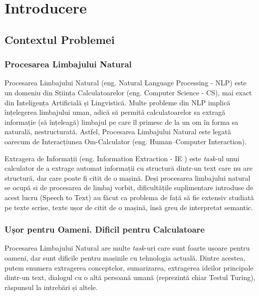 \chapter{Introducere}
\label{chapter:intro}

\section{Contextul Problemei}

\subsection{Procesarea Limbajului Natural}


Procesarea Limbajului Natural (eng. Natural Language Processing - NLP) este un domeniu din Sțiința Calculatoarelor (eng. Computer Science - CS), mai exact din Inteligența Artificială și Lingvistică. Multe probleme din NLP implică înțelegerea limbajului uman, adică să permită calculatoarelor sa extragă informație (să înțeleagă) limbajul pe care îl primesc de la un om în forma sa naturală, nestructurată. Astfel, Procesarea Limbajului Natural este legată oarecum de Interacțiunea Om-Calculator (eng. Human–Computer Interaction).

Extragera de Informații (eng. Information Extraction - IE ) este \textit{task}-ul unui calculator de a extrage automat informații cu structură dintr-un text care nu are structură, dar care poate fi citit de o mașină. Deși procesarea limbajului natural se ocupă si de procesarea de limbaj vorbit, dificultățile suplimentare introduse de acest lucru (Speech to Text) au făcut ca problema de față să fie extensiv studiată pe texte scrise, texte ușor de citit de o mașină, însă greu de interpretat semantic.


\subsection{Ușor pentru Oameni. Dificil pentru Calculatoare}

Procesarea Limbajului Natural are multe \textit{task}-uri care sunt foarte ușoare pentru oameni, dar sunt dificile pentru mașinile cu tehnologia actuală. Dintre acestea, putem enumera extragerea conceptelor, sumarizarea, extragerea ideilor principale dintr-un text, dialogul cu o altă persoană umană (reprezintă chiar Testul Turing), răspunsul la intrebări și altele.

